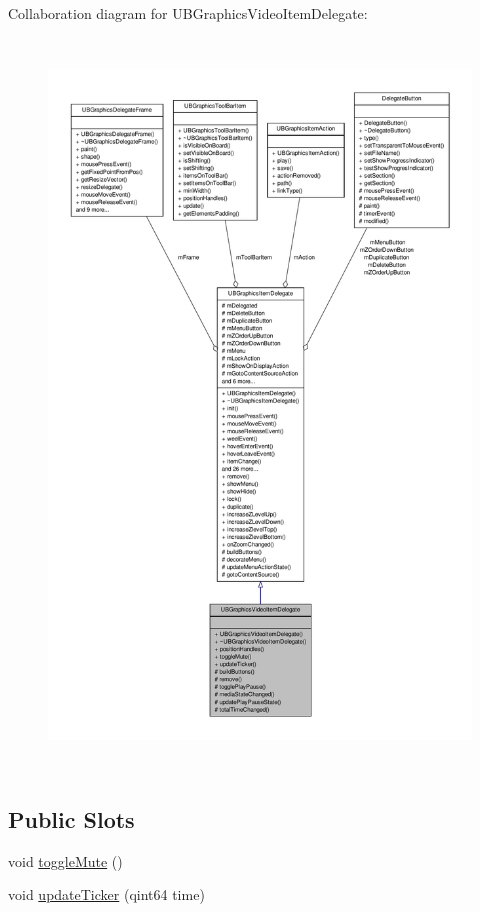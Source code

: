 Collaboration diagram for U\-B\-Graphics\-Video\-Item\-Delegate\-:
\nopagebreak
\begin{figure}[H]
\begin{center}
\leavevmode
\includegraphics[height=550pt]{de/df7/class_u_b_graphics_video_item_delegate__coll__graph}
\end{center}
\end{figure}
\subsection*{Public Slots}
\begin{DoxyCompactItemize}
\item 
void \hyperlink{class_u_b_graphics_video_item_delegate_a6fbf9d94085a38515d1c73b1cc99c006}{toggle\-Mute} ()
\item 
void \hyperlink{class_u_b_graphics_video_item_delegate_ab6408260508eaf9c97607bdd2f503400}{update\-Ticker} (qint64 time)
\end{DoxyCompactItemize}
